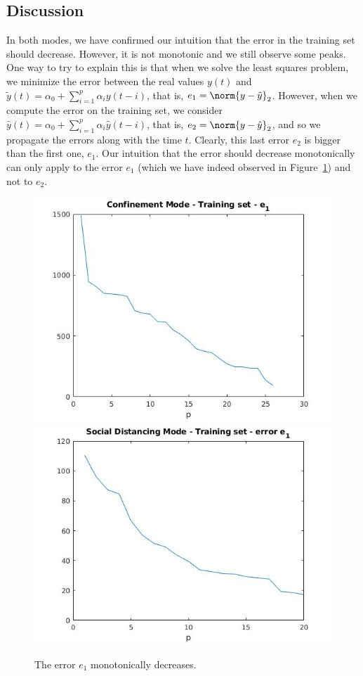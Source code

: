 \documentclass[11pt]{article}
\newcommand{\snorm}[1]{\norm{#1}_2} %
\begin{document}
\subsection*{Discussion}
In both modes, we have confirmed our intuition that the error in the training set should decrease. However, it is not monotonic and we still observe some peaks. One way to try to explain this is that when we solve the least squares problem, we minimize the error between the real values $y(t)$ and $\tilde{y}(t) = \alpha_0 + \sum_{i=1}^p \alpha_iy(t-i)$, that is, $e_1 = \snorm{y-\tilde{y}}$. However, when we compute the error on the training set, we consider $\hat{y}(t) = \alpha_0 + \sum_{i=1}^p \alpha_i \hat{y}(t-i)$, that is, $e_2 = \snorm{y-\hat{y}}$, and so we propagate the errors along with the time $t$. Clearly, this last error $e_2$ is bigger than the first one, $e_1$. Our intuition that the error should decrease monotonically can only apply to the error $e_1$ (which we have indeed observed in Figure~\ref{fig:e1}) and not to $e_2$.
\begin{figure}[h!]
	\centering
	\includegraphics[scale=0.43]{Conf_train_e1.jpg}
	\includegraphics[scale=0.43]{SD_train_e1.jpg}
	\caption{The error $e_1$ monotonically decreases.}
	\label{fig:e1}
\end{figure}
\end{document}
